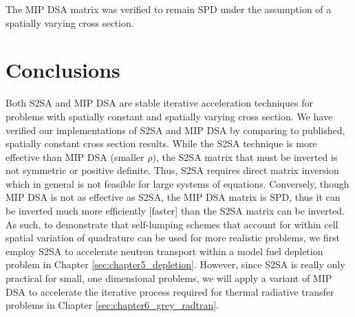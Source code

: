 The MIP DSA matrix was verified to remain SPD under the assumption of a spatially varying cross section.

\section{Conclusions}

Both S2SA and MIP DSA are stable iterative acceleration techniques for problems with spatially constant and spatially varying cross section.
We have verified our implementations of S2SA and MIP DSA by comparing to published, spatially constant cross section results.
While the S2SA technique is more effective than MIP DSA (smaller $\rho$), the S2SA matrix that must be inverted is not symmetric or positive definite.
Thus, S2SA requires direct matrix inversion which in general is not feasible for large systems of equations.
Conversely, though MIP DSA is not as effective as S2SA, the MIP DSA matrix is SPD, thus it can be inverted much more efficiently [faster] \cite{mip_mc} than the S2SA matrix can be inverted.
As such, to demonstrate that self-lumping schemes that account for within cell spatial variation of quadrature can be used for more realistic problems, we first employ S2SA to accelerate neutron transport within a model fuel depletion problem in Chapter \ref{sec:chapter5_depletion}.
However, since S2SA is really only practical for small, one dimensional problems, we will apply a variant of MIP DSA to accelerate the iterative process required for thermal radiative transfer problems in Chapter \ref{sec:chapter6_grey_radtran}.
